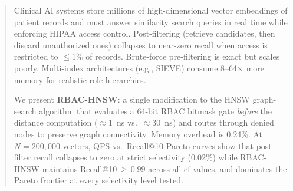 \begin{abstract}
Clinical AI systems store millions of high-dimensional vector embeddings of
patient records and must answer similarity search queries in real time while
enforcing HIPAA access control.
Post-filtering (retrieve candidates, then discard unauthorized ones) collapses
to near-zero recall when access is restricted to $\leq 1\%$ of records.
Brute-force pre-filtering is exact but scales poorly. Multi-index architectures
(e.g., SIEVE) consume 8--64$\times$ more memory for realistic role hierarchies.

We present \textbf{RBAC-HNSW}: a single modification to the HNSW graph-search
algorithm that evaluates a 64-bit RBAC bitmask gate \emph{before} the
distance computation (${\approx}1$~ns vs.\ ${\approx}30$~ns) and routes
through denied nodes to preserve graph connectivity.
Memory overhead is 0.24\%.
At $N\!=\!200{,}000$ vectors, QPS vs.\ Recall@10 Pareto curves show that
post-filter recall collapses to zero at strict selectivity (0.02\%) while
RBAC-HNSW maintains Recall@10\,${\geq}\,0.99$ across all ef values, and
dominates the Pareto frontier at every selectivity level tested.
\end{abstract}

